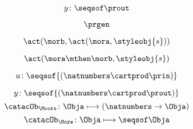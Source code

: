 {\begin{forslides}
        \begin{equation}
            \label{eq:prgen-y-2}
            y\colon \seqsof  \prout
        \end{equation}

        \begin{equation}
            \label{eq:prgen}
            \prgen
        \end{equation}

        \begin{equation}
            \label{eq:now1}
            \act(\morb, \act(\mora, \styleobj{s}))
        \end{equation}


        \begin{equation}
            \label{eq:now2}
            \act(\mora\mthen\morb, \styleobj{s})
        \end{equation}

        \begin{equation}
            \label{eq:ev-sign}
            u\colon \seqsof{(\natnumbers \cartprod \prin)}
        \end{equation}

        \begin{equation}
            \label{eq:ev-sign2}
            y\colon \seqsof{(\natnumbers \cartprod \prout)}
        \end{equation}
        \begin{equation}
            \label{eq:phi-moore}
            {\catacOb_{\Moore}}\colon{\Obja}\longmapsto{(\natnumbers \to \Obja)}
        \end{equation}
        \begin{equation}
            \label{eq:phi-more}
            {\catacOb_{\More}}\colon{\Obja}\longmapsto{\seqsof \Obja}
        \end{equation}
    \end{forslides}
}
